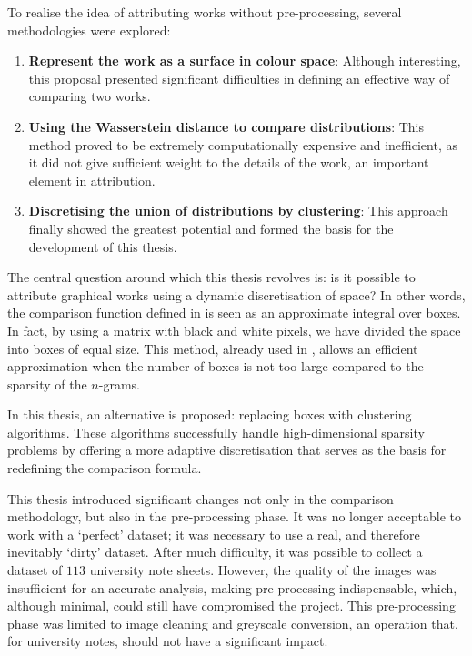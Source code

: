 \begin{toReview}
		\bigskip \noindent To realise the idea of attributing works without pre-processing, several methodologies were explored:

		\begin{enumerate}
			\item \textbf{Represent the work as a surface in colour space}: Although interesting, this proposal presented significant difficulties in defining an effective way of comparing two works.
			\item \textbf{Using the Wasserstein distance to compare distributions}: This method proved to be extremely computationally expensive and inefficient, as it did not give sufficient weight to the details of the work, an important element in attribution.
			\item \textbf{Discretising the union of distributions by clustering}: This approach finally showed the greatest potential and formed the basis for the development of this thesis.
		\end{enumerate}

		\noindent The central question around which this thesis revolves is: is it possible to attribute graphical works using a dynamic discretisation of space? In other words, the comparison function defined in \cite{SapAttribution} is seen as an approximate integral over boxes. In fact, by using a matrix with black and white pixels, we have divided the space into boxes of equal size. This method, already used in \cite{thesis}, allows an efficient approximation when the number of boxes is not too large compared to the sparsity of the $n$-grams.

		\noindent In this thesis, an alternative is proposed: replacing boxes with clustering algorithms. These algorithms successfully handle high-dimensional sparsity problems by offering a more adaptive discretisation that serves as the basis for redefining the comparison formula.

		\bigskip \noindent This thesis introduced significant changes not only in the comparison methodology, but also in the pre-processing phase. It was no longer acceptable to work with a ‘perfect’ dataset; it was necessary to use a real, and therefore inevitably ‘dirty’ dataset. After much difficulty, it was possible to collect a dataset of $113$ university note sheets. However, the quality of the images was insufficient for an accurate analysis, making pre-processing indispensable, which, although minimal, could still have compromised the project. This pre-processing phase was limited to image cleaning and greyscale conversion, an operation that, for university notes, should not have a significant impact.


\end{toReview}
